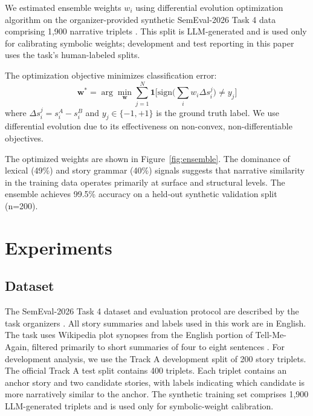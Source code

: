 \documentclass[11pt]{article}
\begin{document}
We estimated ensemble weights $w_i$ using differential evolution optimization algorithm \citep{storn1997differential} on the organizer-provided synthetic SemEval-2026 Task 4 data comprising 1,900 narrative triplets \citep{hatzel-etal-2026-semeval,narrative-similarity-data-2026}. This split is LLM-generated and is used only for calibrating symbolic weights; development and test reporting in this paper uses the task's human-labeled splits.

The optimization objective minimizes classification error:
\begin{equation}
\mathbf{w}^* = \arg\min_{\mathbf{w}} \sum_{j=1}^{N} \mathbf{1}\Big[\text{sign}\big(\textstyle\sum_{i} w_i \Delta s_i^j\big) \neq y_j\Big]
\end{equation}
where $\Delta s_i^j = s_i^A - s_i^B$ and $y_j \in \{-1, +1\}$ is the ground truth label. We use differential evolution due to its effectiveness on non-convex, non-differentiable objectives. 

The optimized weights are shown in Figure~\ref{fig:ensemble}. The dominance of lexical (49\%) and story grammar (40\%) signals suggests that narrative similarity in the training data operates primarily at surface and structural levels. The ensemble achieves 99.5\% accuracy on a held-out synthetic validation split (n=200).

\section{Experiments}

\subsection{Dataset}

The SemEval-2026 Task 4 dataset and evaluation protocol are described by the task organizers \citep{hatzel-etal-2026-semeval,narrative-similarity-dataset-2026,narrative-similarity-data-2026}. All story summaries and labels used in this work are in English. The task uses Wikipedia plot synopses from the English portion of Tell-Me-Again, filtered primarily to short summaries of four to eight sentences \citep{hatzel-etal-2026-semeval}. For development analysis, we use the Track A development split of 200 story triplets. The official Track A test split contains 400 triplets. Each triplet contains an anchor story and two candidate stories, with labels indicating which candidate is more narratively similar to the anchor. The synthetic training set comprises 1,900 LLM-generated triplets and is used only for symbolic-weight calibration.
\end{document}
